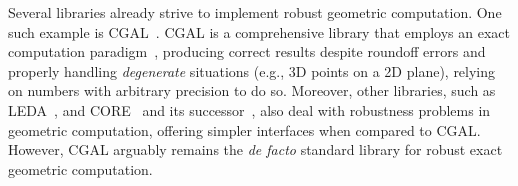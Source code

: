 Several libraries already strive to implement robust geometric computation.  One
such example is \ac{CGAL}~\cite{CGAL:5.3:Project}.  \Ac{CGAL} is a comprehensive
library that employs an exact computation paradigm~\cite{Yap:1995:ECP},
producing correct results despite roundoff errors and properly handling
\textit{degenerate} situations (e.g., 3D points on a 2D plane), relying on
numbers with arbitrary precision to do so.  Moreover, other libraries, such as
\ac{LEDA}~\cite{Mehlhorn:1989:LEDA}, and CORE~\cite{Karamcheti:1999:CLRNGC} and
its successor~\cite{Yu:2010:CORE2}, also deal with robustness problems in
geometric computation, offering simpler interfaces when compared to \ac{CGAL}.
However, \ac{CGAL} arguably remains the \textit{de facto} standard library for
robust exact geometric computation.
